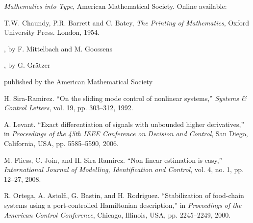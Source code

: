 \documentclass[lettersize,journal]{IEEEtran}
\begin{document}
\begin{thebibliography}{1}

{\it{Mathematics into Type}}, American Mathematical Society. Online available: 

T.W. Chaundy, P.R. Barrett and C. Batey, {\it{The Printing of Mathematics}}, Oxford University Press. London, 1954.

, by F. Mittelbach and M. Goossens

, by G. Gr\"atzer

 published by the American Mathematical Society

H. Sira-Ramirez. ``On the sliding mode control of nonlinear systems,'' \textit{Systems \& Control Letters}, vol. 19, pp. 303--312, 1992.

A. Levant. ``Exact differentiation of signals with unbounded higher derivatives,''  in \textit{Proceedings of the 45th IEEE Conference on Decision and Control}, San Diego, California, USA, pp. 5585--5590, 2006.

M. Fliess, C. Join, and H. Sira-Ramirez. ``Non-linear estimation is easy,'' \textit{International Journal of Modelling, Identification and Control}, vol. 4, no. 1, pp. 12--27, 2008.

R. Ortega, A. Astolfi, G. Bastin, and H. Rodriguez. ``Stabilization of food-chain systems using a port-controlled Hamiltonian description,'' in \textit{Proceedings of the American Control Conference}, Chicago, Illinois, USA, pp. 2245--2249, 2000.

\end{thebibliography}
\end{document}
